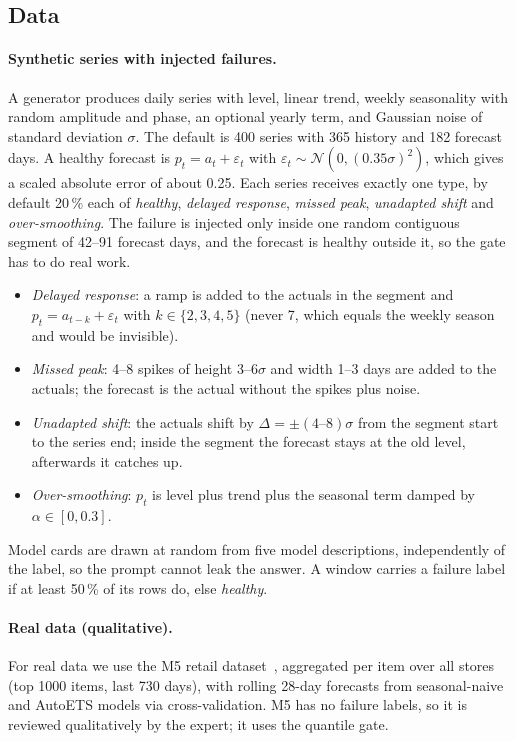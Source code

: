 \documentclass[10pt,twocolumn,a4paper]{article}
\begin{document}
\subsection{Data}

\paragraph{Synthetic series with injected failures.}
A generator produces daily series with level, linear trend, weekly seasonality with random amplitude and phase, an optional yearly term, and Gaussian noise of standard deviation $\sigma$. The default is 400 series with 365 history and 182 forecast days. A healthy forecast is $p_t=a_t+\varepsilon_t$ with $\varepsilon_t\sim\mathcal N(0,(0.35\sigma)^2)$, which gives a scaled absolute error of about 0.25. Each series receives exactly one type, by default 20\,\% each of \emph{healthy}, \emph{delayed response}, \emph{missed peak}, \emph{unadapted shift} and \emph{over-smoothing}. The failure is injected only inside one random contiguous segment of 42--91 forecast days, and the forecast is healthy outside it, so the gate has to do real work.
\begin{itemize}
  \item \emph{Delayed response}: a ramp is added to the actuals in the segment and $p_t=a_{t-k}+\varepsilon_t$ with $k\in\{2,3,4,5\}$ (never 7, which equals the weekly season and would be invisible).
  \item \emph{Missed peak}: 4--8 spikes of height $3$--$6\sigma$ and width 1--3 days are added to the actuals; the forecast is the actual without the spikes plus noise.
  \item \emph{Unadapted shift}: the actuals shift by $\Delta=\pm(4\text{--}8)\sigma$ from the segment start to the series end; inside the segment the forecast stays at the old level, afterwards it catches up.
  \item \emph{Over-smoothing}: $p_t$ is level plus trend plus the seasonal term damped by $\alpha\in[0,0.3]$.
\end{itemize}
Model cards are drawn at random from five model descriptions, independently of the label, so the prompt cannot leak the answer. A window carries a failure label if at least 50\,\% of its rows do, else \emph{healthy}.

\paragraph{Real data (qualitative).}
For real data we use the M5 retail dataset~\cite{makridakis2022}, aggregated per item over all stores (top 1000 items, last 730 days), with rolling 28-day forecasts from seasonal-naive and AutoETS models via cross-validation. M5 has no failure labels, so it is reviewed qualitatively by the expert; it uses the quantile gate.
\end{document}
